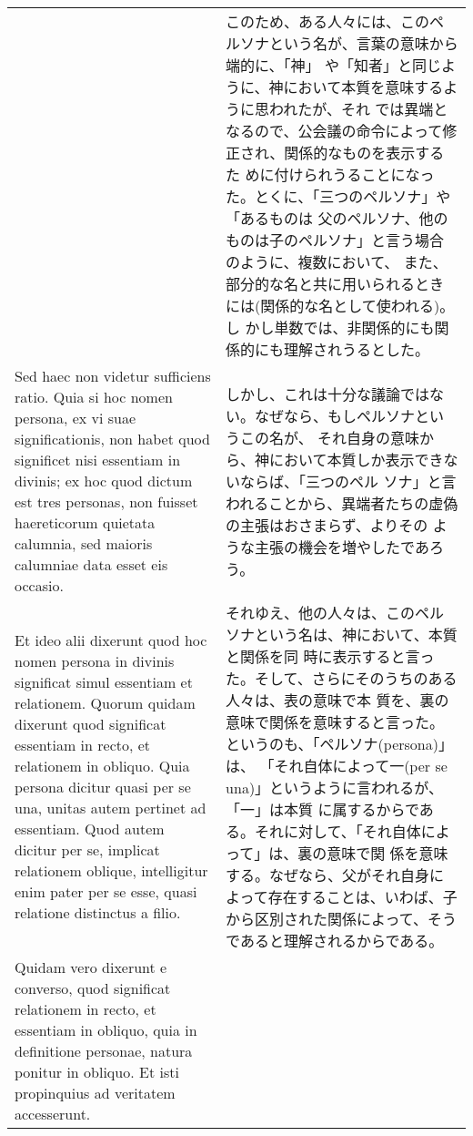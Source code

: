 \documentclass[10pt]{jsarticle} %
\begin{document}
\begin{longtable}{p{21em}p{21em}}
&

このため、ある人々には、このペルソナという名が、言葉の意味から端的に、「神」
 や「知者」と同じように、神において本質を意味するように思われたが、それ
 では異端となるので、公会議の命令によって修正され、関係的なものを表示するた
 めに付けられうることになった。とくに、「三つのペルソナ」や「あるものは
 父のペルソナ、他のものは子のペルソナ」と言う場合のように、複数において、
 また、部分的な名と共に用いられるときには(関係的な名として使われる)。し
 かし単数では、非関係的にも関係的にも理解されうるとした。


\\


 Sed haec non videtur sufficiens ratio. Quia si hoc nomen
persona, ex vi suae significationis, non habet quod significet nisi
essentiam in divinis; ex hoc quod dictum est tres personas, non fuisset
haereticorum quietata calumnia, sed maioris calumniae data esset eis
occasio. 


&


しかし、これは十分な議論ではない。なぜなら、もしペルソナというこの名が、
 それ自身の意味から、神において本質しか表示できないならば、「三つのペル
 ソナ」と言われることから、異端者たちの虚偽の主張はおさまらず、よりその
 ような主張の機会を増やしたであろう。



\\


Et ideo alii dixerunt quod hoc nomen persona in divinis
significat simul essentiam et relationem. Quorum quidam dixerunt quod
significat essentiam in recto, et relationem in obliquo. Quia persona
dicitur quasi per se una, unitas autem pertinet ad essentiam. Quod autem
dicitur per se, implicat relationem oblique, intelligitur enim pater per
se esse, quasi relatione distinctus a filio. 


&

それゆえ、他の人々は、このペルソナという名は、神において、本質と関係を同
 時に表示すると言った。そして、さらにそのうちのある人々は、表の意味で本
 質を、裏の意味で関係を意味すると言った。というのも、「ペルソナ(persona)」は、
 「それ自体によって一(per se una)」というように言われるが、「一」は本質
 に属するからである。それに対して、「それ自体によって」は、裏の意味で関
 係を意味する。なぜなら、父がそれ自身によって存在することは、いわば、子
 から区別された関係によって、そうであると理解されるからである。


\\


Quidam vero dixerunt e
converso, quod significat relationem in recto, et essentiam in obliquo,
quia in definitione personae, natura ponitur in obliquo. Et isti
propinquius ad veritatem accesserunt. 


\end{longtable}
\end{document}
